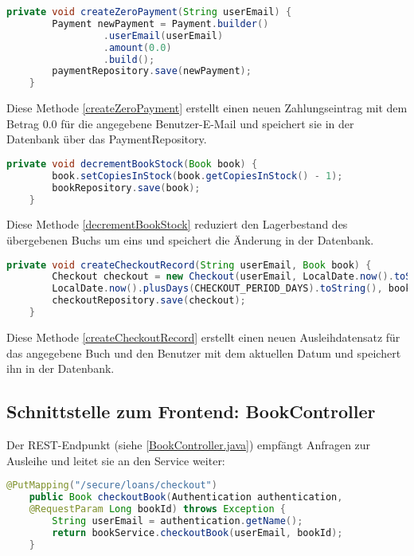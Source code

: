 \begin{lstlisting}[language=Java, caption=Erstellung einer Nullzahlung mit createZeroPayment(), label=createZeroPayment]
	private void createZeroPayment(String userEmail) {
		Payment newPayment = Payment.builder()
		         .userEmail(userEmail)
		         .amount(0.0)
		         .build();
		paymentRepository.save(newPayment);
	}
\end{lstlisting}
Diese Methode \ref{createZeroPayment} erstellt einen neuen Zahlungseintrag mit dem Betrag 0.0 für die angegebene Benutzer-E-Mail und speichert sie in der Datenbank über das PaymentRepository.

\begin{lstlisting}[language=Java, caption=Reduzierung des Buchbestands, label=decrementBookStock]
	private void decrementBookStock(Book book) {
		book.setCopiesInStock(book.getCopiesInStock() - 1);
		bookRepository.save(book);
	}
\end{lstlisting}
Diese Methode \ref{decrementBookStock} reduziert den Lagerbestand des übergebenen Buchs um eins und speichert die Änderung in der Datenbank.

\begin{lstlisting}[language=Java, caption=Erstellung eines Ausleihdatensatzes, label=createCheckoutRecord, breaklines=true]
	private void createCheckoutRecord(String userEmail, Book book) {
		Checkout checkout = new Checkout(userEmail, LocalDate.now().toString(),
		LocalDate.now().plusDays(CHECKOUT_PERIOD_DAYS).toString(), book.getId());
		checkoutRepository.save(checkout);
	}
\end{lstlisting}
Diese Methode \ref{createCheckoutRecord} erstellt einen neuen Ausleihdatensatz für das angegebene Buch und den Benutzer mit dem aktuellen Datum und speichert ihn in der Datenbank.


\subsection*{Schnittstelle zum Frontend: BookController}

Der REST-Endpunkt (siehe \ref{BookController.java}) empfängt Anfragen zur Ausleihe und leitet sie an den Service weiter:

\begin{lstlisting}[language=Java, caption=REST-Endpunkt \texttt{checkoutBook()} im \texttt{BookController}, label=BookController.java]
	@PutMapping("/secure/loans/checkout")
	public Book checkoutBook(Authentication authentication,
	@RequestParam Long bookId) throws Exception {
		String userEmail = authentication.getName();
		return bookService.checkoutBook(userEmail, bookId);
	}
\end{lstlisting}

